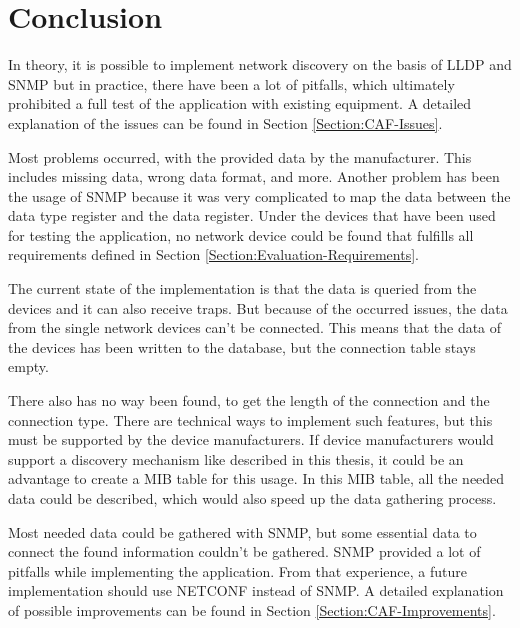 \section{Conclusion}
\label{Section:CAF-Conclusion}

In theory, it is possible to implement network discovery on the basis of LLDP and SNMP but in practice, there have been a lot of pitfalls, which ultimately prohibited a full test of the application with existing equipment. A detailed explanation of the issues can be found in Section \ref{Section:CAF-Issues}.

\newpage
Most problems occurred, with the provided data by the manufacturer. This includes missing data, wrong data format, and more. Another problem has been the usage of SNMP because it was very complicated to map the data between the data type register and the data register. Under the devices that have been used for testing the application, no network device could be found that fulfills all requirements defined in Section \ref{Section:Evaluation-Requirements}.

The current state of the implementation is that the data is queried from the devices and it can also receive traps. But because of the occurred issues, the data from the single network devices can't be connected. This means that the data of the devices has been written to the database, but the connection table stays empty.

There also has no way been found, to get the length of the connection and the connection type. There are technical ways to implement such features, but this must be supported by the device manufacturers. If device manufacturers would support a discovery mechanism like described in this thesis, it could be an advantage to create a MIB table for this usage. In this MIB table, all the needed data could be described, which would also speed up the data gathering process.

Most needed data could be gathered with SNMP, but some essential data to connect the found information couldn't be gathered. SNMP provided a lot of pitfalls while implementing the application. From that experience, a future implementation should use NETCONF instead of SNMP. A detailed explanation of possible improvements can be found in Section \ref{Section:CAF-Improvements}.
